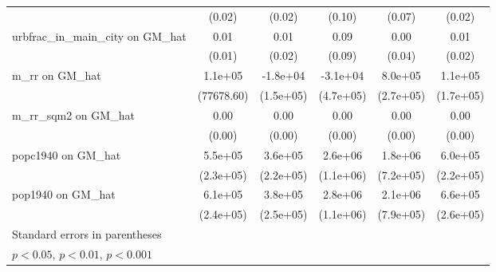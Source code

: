 \begin{table}[htbp]
\begin{tabular}{l*{5}{c}}
                &   (0.02)         &   (0.02)         &   (0.10)         &   (0.07)         &   (0.02)         \\
\addlinespace
urbfrac\_in\_main\_city on GM\_hat&     0.01         &     0.01         &     0.09         &     0.00         &     0.01         \\
                &   (0.01)         &   (0.02)         &   (0.09)         &   (0.04)         &   (0.02)         \\
\addlinespace
m\_rr on GM\_hat  &  1.1e+05         & -1.8e+04         & -3.1e+04         &  8.0e+05\sym{**} &  1.1e+05         \\
                &(77678.60)         &(1.5e+05)         &(4.7e+05)         &(2.7e+05)         &(1.7e+05)         \\
\addlinespace
m\_rr\_sqm2 on GM\_hat&     0.00\sym{*}  &     0.00\sym{*}  &     0.00\sym{**} &     0.00         &     0.00\sym{*}  \\
                &   (0.00)         &   (0.00)         &   (0.00)         &   (0.00)         &   (0.00)         \\
\addlinespace
popc1940 on GM\_hat&  5.5e+05\sym{*}  &  3.6e+05         &  2.6e+06\sym{*}  &  1.8e+06\sym{*}  &  6.0e+05\sym{**} \\
                &(2.3e+05)         &(2.2e+05)         &(1.1e+06)         &(7.2e+05)         &(2.2e+05)         \\
\addlinespace
pop1940 on GM\_hat&  6.1e+05\sym{*}  &  3.8e+05         &  2.8e+06\sym{*}  &  2.1e+06\sym{**} &  6.6e+05\sym{*}  \\
                &(2.4e+05)         &(2.5e+05)         &(1.1e+06)         &(7.9e+05)         &(2.6e+05)         \\
\bottomrule
\multicolumn{6}{l}{\footnotesize Standard errors in parentheses}\\
\multicolumn{6}{l}{\footnotesize \sym{*} \(p<0.05\), \sym{**} \(p<0.01\), \sym{***} \(p<0.001\)}\\
\end{tabular}
\end{table}
